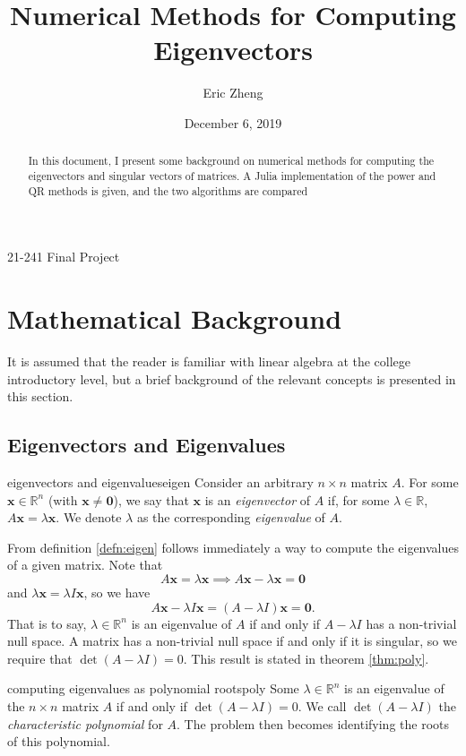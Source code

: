 \documentclass{article}
\title{Numerical Methods for Computing Eigenvectors}
\author{Eric Zheng}
\date{December 6, 2019}
\makeatletter
\renewcommand{\maketitle}{
  \begin{center}
  {\vspace*{10mm}\LARGE\@title\par}
  {\vspace{7mm}\large\@author\par}
  {\vspace{1mm}21-241 Final Project\par}
  {\vspace{3mm}\large\@date\vspace{8mm}}
  \end{center}
}
\let\vec\mathbf
\makeatother
\begin{document}
\maketitle

\begin{abstract}
  In this document, I present some background on numerical methods for computing
  the eigenvectors and singular vectors of matrices. A Julia implementation of
  the power and QR methods is given, and the two algorithms are compared
\end{abstract}

\section{Mathematical Background}
It is assumed that the reader is familiar with linear algebra at the college
introductory level, but a brief background of the relevant concepts is presented
in this section.

\subsection{Eigenvectors and Eigenvalues}
\begin{definition}{eigenvectors and eigenvalues}{eigen}
  Consider an arbitrary $n \times n$ matrix $A$. For some $\vec{x} \in \mathbb{R}^n$ (with $\vec{x} \neq \vec{0}$), we say that $\vec{x}$ is an \textit{eigenvector} of $A$ if, for some $\lambda \in \mathbb{R}$, $A\vec{x} = \lambda\vec{x}$. We denote $\lambda$ as the corresponding \textit{eigenvalue} of $A$.
\end{definition}

From definition \ref{defn:eigen} follows immediately a way to compute the eigenvalues of a given matrix. Note that
\begin{equation*}
  A\vec{x} = \lambda\vec{x} \implies A\vec{x} - \lambda\vec{x} = \vec{0}
\end{equation*}
and $\lambda\vec{x} = \lambda I \vec{x}$, so we have
\begin{equation*}
  A\vec{x} - \lambda I \vec{x} = (A - \lambda I)\vec{x} = \vec{0}.
\end{equation*}
That is to say, $\lambda \in \mathbb{R}^n$ is an eigenvalue of $A$ if and only if $A - \lambda I$ has a non-trivial null space. A matrix has a non-trivial null space if and only if it is singular, so we require that $\det(A - \lambda I) = 0$. This result is stated in theorem \ref{thm:poly}.

\begin{theorem}{computing eigenvalues as polynomial roots}{poly}
  Some $\lambda \in \mathbb{R}^n$ is an eigenvalue of the $n \times n$ matrix $A$ if and only if $\det (A - \lambda I) = 0$. We call $\det (A - \lambda I)$ the \textit{characteristic polynomial} for $A$. The problem then becomes identifying the roots of this polynomial.
\end{theorem}
\end{document}
